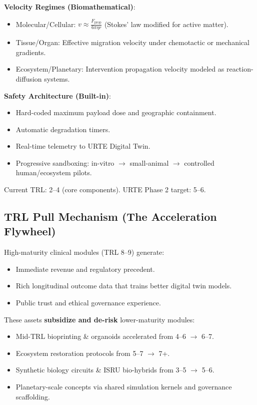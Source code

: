 \documentclass[11pt,a4paper]{article}
\begin{document}
\textbf{Velocity Regimes (Biomathematical)}:
\begin{itemize}
    \item Molecular/Cellular: $v \approx \frac{F_\text{prop}}{6\pi\eta r}$ (Stokes' law modified for active matter).
    \item Tissue/Organ: Effective migration velocity under chemotactic or mechanical gradients.
    \item Ecosystem/Planetary: Intervention propagation velocity modeled as reaction-diffusion systems.
\end{itemize}

\textbf{Safety Architecture (Built-in)}:
\begin{itemize}
    \item Hard-coded maximum payload dose and geographic containment.
    \item Automatic degradation timers.
    \item Real-time telemetry to URTE Digital Twin.
    \item Progressive sandboxing: in-vitro $\to$ small-animal $\to$ controlled human/ecosystem pilots.
\end{itemize}

Current TRL: 2--4 (core components). URTE Phase 2 target: 5--6.

\subsection{TRL Pull Mechanism (The Acceleration Flywheel)}

High-maturity clinical modules (TRL 8--9) generate:
\begin{itemize}
    \item Immediate revenue and regulatory precedent.
    \item Rich longitudinal outcome data that trains better digital twin models.
    \item Public trust and ethical governance experience.
\end{itemize}

These assets \textbf{subsidize and de-risk} lower-maturity modules:
\begin{itemize}
    \item Mid-TRL bioprinting \& organoids accelerated from 4--6 $\to$ 6--7.
    \item Ecosystem restoration protocols from 5--7 $\to$ 7+.
    \item Synthetic biology circuits \& ISRU bio-hybrids from 3--5 $\to$ 5--6.
    \item Planetary-scale concepts via shared simulation kernels and governance scaffolding.
\end{itemize}
\end{document}
